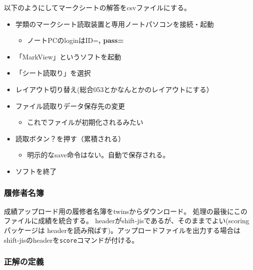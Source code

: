 以下のようにしてマークシートの解答をcsvファイルにする。

\begin{itemize}
\item 学類のマークシート読取装置と専用ノートパソコンを接続・起動

\begin{itemize}
\item ノートPCのloginはID=\textbf{\textbf{, pass=}}

\end{itemize}

\item 「MarkView」というソフトを起動

\item 「シート読取り」を選択

\item レイアウト切り替え(総合053とかなんとかのレイアウトにする）

\item ファイル読取りデータ保存先の変更

\begin{itemize}
\item これでファイルが初期化されるみたい

\end{itemize}

\item 読取ボタン？を押す（累積される）

\begin{itemize}
\item 明示的なsave命令はない。自動で保存される。

\end{itemize}

\item ソフトを終了

\end{itemize}

\subsubsection{履修者名簿}
\label{履修者名簿}

成績アップロード用の履修者名簿をtwinsからダウンロード。
処理の最後にこのファイルに成績を統合する。
headerがshift-jisであるが、そのままでよい(scoringパッケージは
headerを読み飛ばす)。アップロードファイルを出力する場合は
shift-jisのheaderを\texttt{score}コマンドが付ける。

\subsubsection{正解の定義}
\label{正解の定義}

